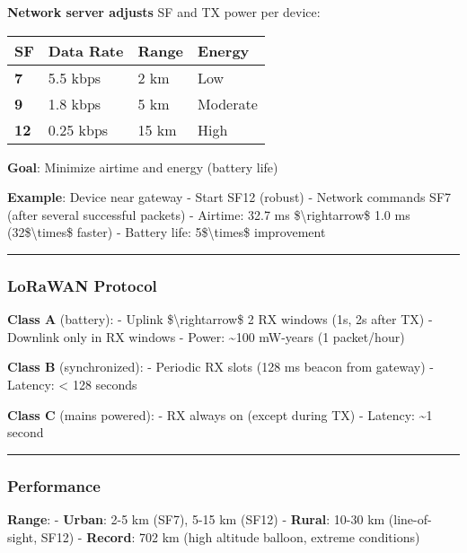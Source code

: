 \textbf{Network server adjusts} SF and TX power per device:

{\def\LTcaptype{} %
\begin{longtable}[]{@{}llll@{}}
\toprule\noalign{}
SF & Data Rate & Range & Energy \\
\midrule\noalign{}
\endhead
\bottomrule\noalign{}
\endlastfoot
\textbf{7} & 5.5 kbps & 2 km & Low \\
\textbf{9} & 1.8 kbps & 5 km & Moderate \\
\textbf{12} & 0.25 kbps & 15 km & High \\
\end{longtable}
}

\textbf{Goal}: Minimize airtime and energy (battery life)

\textbf{Example}: Device near gateway - Start SF12 (robust) - Network
commands SF7 (after several successful packets) - Airtime: 32.7 ms
\$\textbackslash rightarrow\$ 1.0 ms (32\$\textbackslash times\$ faster)
- Battery life: 5\$\textbackslash times\$ improvement

\begin{center}\rule{0.5\linewidth}{0.5pt}\end{center}

\subsubsection{LoRaWAN Protocol}\label{lorawan-protocol}

\textbf{Class A} (battery): - Uplink \$\textbackslash rightarrow\$ 2 RX
windows (1s, 2s after TX) - Downlink only in RX windows - Power:
\textasciitilde100 mW-years (1 packet/hour)

\textbf{Class B} (synchronized): - Periodic RX slots (128 ms beacon from
gateway) - Latency: \textless{} 128 seconds

\textbf{Class C} (mains powered): - RX always on (except during TX) -
Latency: \textasciitilde1 second

\begin{center}\rule{0.5\linewidth}{0.5pt}\end{center}

\subsubsection{Performance}\label{performance-5}

\textbf{Range}: - \textbf{Urban}: 2-5 km (SF7), 5-15 km (SF12) -
\textbf{Rural}: 10-30 km (line-of-sight, SF12) - \textbf{Record}: 702 km
(high altitude balloon, extreme conditions)

